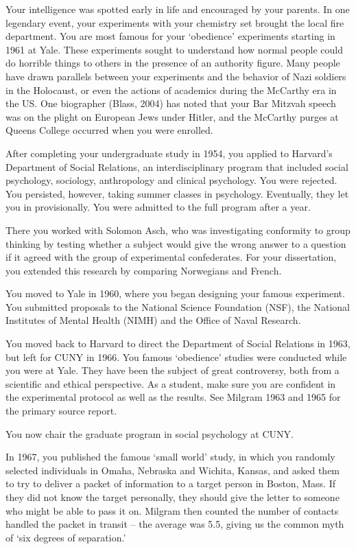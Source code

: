 \begin{refsection}
Your intelligence was spotted early in life and encouraged by your parents. In one legendary event, your experiments with your chemistry set brought the local fire department. You are most famous for your `obedience' experiments starting in 1961 at Yale. These experiments sought to understand how normal people could do horrible things to others in the presence of an authority figure. Many people have drawn parallels between your experiments and the behavior of Nazi soldiers in the Holocaust, or even the actions of academics during the McCarthy era in the US. One biographer (Blass, 2004) has noted that your Bar Mitzvah speech was on the plight on European Jews under Hitler, and the McCarthy purges at Queens College occurred when you were enrolled.

After completing your undergraduate study in 1954, you applied to Harvard's Department of Social Relations, an interdisciplinary program that included social psychology, sociology, anthropology and clinical psychology. You were rejected. You persisted, however, taking summer classes in psychology. Eventually, they let you in provisionally. You were admitted to the full program after a year.

There you worked with Solomon Asch, who was investigating conformity to group thinking by testing whether a subject would give the wrong answer to a question if it agreed with the group of experimental confederates. For your dissertation, you extended this research by comparing Norwegians and French.

You moved to Yale in 1960, where you began designing your famous experiment. You submitted proposals to the National Science Foundation (NSF), the National Institutes of Mental Health (NIMH) and the Office of Naval Research.

You moved back to Harvard to direct the Department of Social Relations in 1963, but left for CUNY in 1966. You famous `obedience' studies were conducted while you were at Yale. They have been the subject of great controversy, both from a scientific and ethical perspective. As a student, make sure you are confident in the experimental protocol as well as the results. See Milgram 1963 and 1965 for the primary source report.

You now chair the graduate program in social psychology at CUNY.

In 1967, you published the famous `small world' study, in which you randomly selected individuals in Omaha, Nebraska and Wichita, Kansas, and asked them to try to deliver a packet of information to a target person in Boston, Mass. If they did not know the target personally, they should give the letter to someone who might be able to pass it on. Milgram then counted the number of contacts handled the packet in transit – the average was 5.5, giving us the common myth of `six degrees of separation.' 


\end{refsection}
